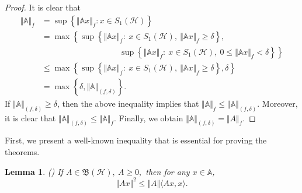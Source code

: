 \documentclass[12pt]{article}
\newtheorem{lemma}{Lemma}
\begin{document}
\begin{proof}
It is clear that
\begin{align*}
\Vert \mathbb{A} \Vert_f
&= \sup \left\lbrace  \Vert \mathbb{A} x \Vert_f : x \in S_{1}(\mathcal{H}) \right\rbrace  \\
&= \max \left\lbrace
\sup \left\lbrace  \Vert \mathbb{A} x \Vert_f : \
x \in S_{1}(\mathcal{H}), \
\Vert \mathbb{A} x\Vert_f \geq \delta\right\rbrace, \right. \\
&\hspace{4cm} \left. \sup \left\lbrace  \Vert \mathbb{A} x \Vert_f: \
x \in S_{1}(\mathcal{H}), \ 0\leq
\Vert \mathbb{A} x\Vert_f < \delta\right\rbrace \right\rbrace \\
&\leq \max \left\lbrace
\sup \left\lbrace \Vert \mathbb{A} x \Vert_{f} : \
x \in S_{1}(\mathcal{H}), \
\Vert \mathbb{A} x\Vert_f \geq \delta\right\rbrace, \delta \right\rbrace \\
&= \max \left\lbrace \delta, \Vert \mathbb{A} \Vert_{(f,\delta )}  \right\rbrace .
\end{align*}
If $\Vert\mathbb{A}\Vert_{(f,\delta)} \geq \delta$, then the above inequality implies that
\(
\Vert \mathbb{A} \Vert_f \leq \Vert \mathbb{A} \Vert_{(f,\delta)}.
\)
Moreover, it is clear that
\(
\Vert \mathbb{A} \Vert_{(f,\delta)} \leq \Vert \mathbb{A} \Vert_f.
\)
Finally, we obtain
\(
\Vert \mathbb{A} \Vert_{(f,\delta)} = \Vert A \Vert_f.\)
\end{proof}

First, we present a well-known inequality that is essential for proving the theorems.

\begin{lemma} \textnormal{(\!\!\cite{Berezansky})}
\label{lem4}
If $ A\in \mathfrak{B}(\mathcal{H}) , \ A\geq 0 ,$ then for any $ x\in \mathbb{A} $,
\[
\Vert Ax \Vert^{2}\leq \Vert A \Vert \langle Ax,x\rangle .
\]
\end{lemma}
\end{document}
